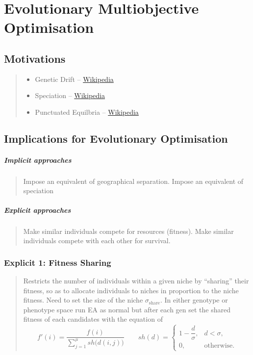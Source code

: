 \documentclass[a4paper, 11pt]{report}
\begin{document}
\chapter{Evolutionary Multiobjective Optimisation}
\section{Motivations}
    \begin{quote}
        \begin{itemize}
            \item Genetic Drift -- \href{https://en.wikipedia.org/wiki/Genetic_drift}{Wikipedia}
            \item Speciation -- \href{https://en.wikipedia.org/wiki/Speciation}{Wikipedia}
            \item Punctuated Equilbria -- \href{https://en.wikipedia.org/wiki/Punctuated_equilibrium}{Wikipedia}
        \end{itemize}
    \end{quote}
\section{Implications for Evolutionary Optimisation}
\paragraph{Implicit approaches}
    \begin{quote}
        Impose an equivalent of geographical separation. Impose an equivalent of speciation
    \end{quote}
\paragraph{Explicit approaches}
    \begin{quote}
        Make similar individuals compete for resources (fitness). Make similar individuals compete with each other for survival.
    \end{quote}
\subsection{Explicit 1: Fitness Sharing}
    \begin{quote}
        Restricts the number of individuals within a given niche by ``sharing'' their fitness, so as to allocate individuals to niches in proportion to the 
        niche fitness. Need to set the size of the niche $\sigma_{\text{share}}$. In either genotype or phenotype space run EA as normal but after each gen 
        set the shared fitness of each candidates with the equation of
        \begin{equation*}
            f'(i) = \frac{f(i)}{\displaystyle\sum_{j=1}^{\mu} sh\bigl(d(i,j)\bigr)}
            \qquad sh(d) =
            \begin{cases}
                1 - \dfrac{d}{\sigma}, & d < \sigma,\\[6pt]
                0, & \text{otherwise.}
            \end{cases} 
        \end{equation*}
    \end{quote}
\end{document}
